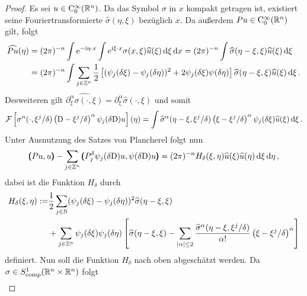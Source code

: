 \begin{proof}
Es sei $u\in\mathrm C^\infty_0(\mathbb R^n)$. Da das Symbol $\sigma$ in $x$ kompakt getragen ist, existiert seine Fouriertransformierte $\widehat\sigma (\eta,\xi)$ bezüglich $x$. Da außerdem $ P u\in\mathrm C^\infty_0(\mathbb R^n)$ gilt, folgt
\begin{align}
\begin{split}
\widehat{ P u}(\eta) &= (2\pi)^{-n}\int \mathrm e^{-\mathrm i\eta\cdot x} \int e^{\mathrm i\xi\cdot x}\sigma(x,\xi) \widehat u (\xi) \,\mathrm d\xi\,\mathrm d x = (2\pi)^{-n}\int \widehat\sigma(\eta - \xi,\xi)\widehat u(\xi)\,\mathrm d\xi \\
&= (2\pi)^ {-n}\int \sum_{j\in\mathbb Z^n} \frac 1 2\left[(\psi_j(\delta \xi) - \psi_j(\delta \eta))^2 + 2 \psi_j(\delta\xi)\psi(\delta \eta)\right] \widehat\sigma(\eta - \xi,\xi)\widehat u(\xi)\,\mathrm d\xi\,.
\end{split}
\end{align}
Desweiteren gilt $\widehat{\partial^\alpha_\xi\sigma(\cdot,\xi)} = \partial_\xi^\alpha\widehat \sigma(\cdot,\xi)$ und somit
\begin{align}
\mathcal{F}\left[\sigma^\alpha(\cdot,\xi^j/\delta)\left( \mathrm D - \xi^j/\delta\right)^\alpha\psi_j(\delta\mathrm D)u\right](\eta) = \int \widehat \sigma^\alpha(\eta-\xi,\xi^j/\delta)\left( \xi - \xi^j/\delta\right)^\alpha\psi_j(\delta\xi)\widehat u(\xi)\,\mathrm d\xi\,.
\end{align}
Unter Ausnutzung des Satzes von Plancherel folgt nun
\begin{align}
\pmb(Pu,u\pmb)  - \sum_{j\in\mathbb Z^n}\pmb( P_j^\delta\psi_j(\delta\mathrm D )u, \psi(\delta\mathrm D )u \pmb) = (2\pi)^{-n} \relax H_\delta (\xi,\eta) \widehat u(\xi)\widehat u(\eta)\,\mathrm d\xi\,\mathrm d\eta\,,
\end{align}
dabei ist die Funktion $H_\delta$ durch
\begin{align}\label{eq:hdeltadef}
\begin{split}
H_\delta(\xi,\eta) := &\frac 1 2 \sum_{j\in \mathbb N}(\psi_j(\delta \xi) - \psi_j(\delta \eta))^2\widehat \sigma(\eta-\xi,\xi)\\
&+ \sum_{j\in\mathbb Z^n} \psi_j(\delta\xi)\psi_j(\delta \eta)\left[
\widehat \sigma(\eta-\xi,\xi) - \sum_{\lvert\alpha\rvert \le 2} \frac{\widehat\sigma^\alpha(\eta-\xi,\xi^j/\delta)}{\alpha!}\left( \xi - \xi^j/\delta\right)^\alpha
\right]
\end{split}
\end{align}
definiert. Nun soll die Funktion $H_\delta$ nach oben abgeschätzt werden. Da $\sigma\in S^1_{\rm comp}(\mathbb R^n\times\mathbb R^n)$ folgt
\begin{align}

\end{align}
\end{proof}
